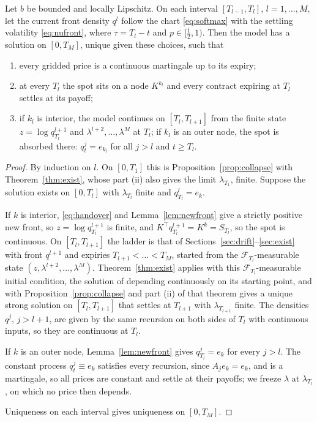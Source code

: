 \begin{corollary}\label{cor:patch}
Let $b$ be bounded and locally Lipschitz. On each interval $[T_{l-1},T_l]$,
$l=1,\dots,M$, let the current front density $q^l$ follow the chart \eqref{eq:softmax}
with the settling volatility \eqref{eq:nufront}, where $\tau=T_l-t$ and
$p\in[\tfrac12,1)$. Then the model has a solution on $[0,T_M]$, unique given these
choices, such that
\begin{enumerate}[label=(\roman*),leftmargin=2em,itemsep=1pt]
\item every gridded price is a continuous martingale up to its expiry;
\item at every $T_l$ the spot sits on a node $K^{k_l}$ and every contract expiring at
  $T_l$ settles at its payoff;
\item if $k_l$ is interior, the model continues on $[T_l,T_{l+1}]$ from the finite state
  $z=\log q^{l+1}_{T_l}$ and $\lambda^{l+2},\dots,\lambda^M$ at $T_l$; if $k_l$ is an
  outer node, the spot is absorbed there: $q^j_t=e_{k_l}$ for all $j>l$ and $t\ge T_l$.
\end{enumerate}
\end{corollary}

\begin{proof}
By induction on $l$. On $[0,T_1]$ this is Proposition~\ref{prop:collapse} with
Theorem~\ref{thm:exist}, whose part (ii) also gives the limit
$\lambda_{T_1}$, finite. Suppose the solution exists on $[0,T_l]$ with $\lambda_{T_l}$
finite and $q^l_{T_l}=e_k$.

If $k$ is interior, \eqref{eq:handover} and Lemma~\ref{lem:newfront} give a strictly
positive new front, so $z=\log q^{l+1}_{T_l}$ is finite, and
$K^{\!\top}q^{l+1}_{T_l}=K^k=S_{T_l}$, so the spot is continuous. On $[T_l,T_{l+1}]$ the
ladder is that of Sections~\ref{sec:drift}--\ref{sec:exist} with front $q^{l+1}$ and
expiries $T_{l+1}<\dots<T_M$, started from the $\mathcal F_{T_l}$-measurable state
$(z,\lambda^{l+2},\dots,\lambda^M)$. Theorem~\ref{thm:exist} applies with this
$\mathcal F_{T_l}$-measurable initial condition, the solution of
\cite[Theorem~V.38]{Protter2005} depending continuously on its starting point,
and with Proposition~\ref{prop:collapse} and part (ii) of that theorem gives a unique
strong solution on $[T_l,T_{l+1}]$ that settles at $T_{l+1}$ with $\lambda_{T_{l+1}}$
finite. The densities $q^j$, $j>l+1$, are given by the same recursion on both sides of
$T_l$ with continuous inputs, so they are continuous at $T_l$.

If $k$ is an outer node, Lemma~\ref{lem:newfront} gives $q^j_{T_l}=e_k$ for every $j>l$.
The constant process $q^j_t\equiv e_k$ satisfies every recursion, since $A_je_k=e_k$, and
is a martingale, so all prices are constant and settle at their payoffs; we freeze
$\lambda$ at $\lambda_{T_l}$, on which no price then depends.

Uniqueness on each interval gives uniqueness on $[0,T_M]$.
\end{proof}

